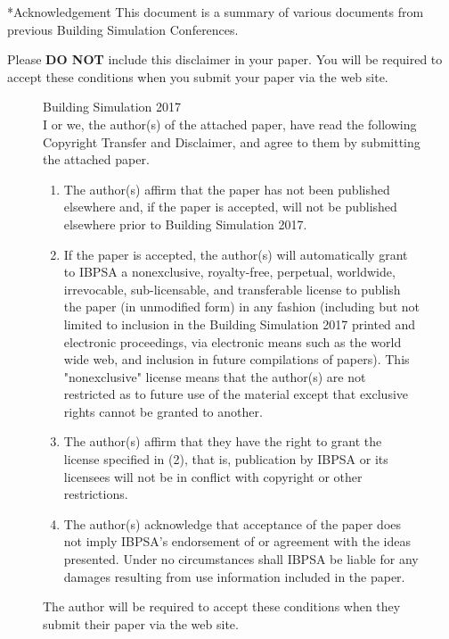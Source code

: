 \documentclass[twocolumn, a4paper,10pt]{article}
\makeatletter
\renewcommand\section{\@startsection{section}{1}{\z@}{0.25cm}{0.1cm}{\normalfont\large\bfseries}}
\makeatother
\begin{document}
\section*{Acknowledgement}
This document is a summary of various documents from previous Building Simulation Conferences.





\newpage
\onecolumn
Please \textbf{DO NOT} include this disclaimer in your paper.  You will be required to accept these conditions when you  submit your paper via the web site.
\begin{figure}
\centering
\begin{boxedminipage}{\textwidth}
Building Simulation 2017\\

I or we, the author(s) of the attached paper, have read the following Copyright Transfer and Disclaimer, and agree to them by submitting the attached paper.
\begin{enumerate}
\item
The author(s) affirm that the paper has not been published elsewhere and, if the paper is accepted, will not be published elsewhere prior to Building Simulation 2017.
\item
If the paper is accepted, the author(s) will automatically grant to IBPSA a nonexclusive, royalty-free, perpetual, worldwide, irrevocable, sub-licensable, and transferable license to publish the paper (in unmodified form) in any fashion (including but not limited to inclusion in the Building Simulation 2017 printed and electronic proceedings, via electronic means such as the world wide web, and inclusion in future compilations of papers).  This "nonexclusive" license means that the author(s) are not restricted as to future use of the material except that exclusive rights cannot be granted to another.
\item
The author(s) affirm that they have the right to grant the license specified in (2), that is, publication by IBPSA or its licensees will not be in conflict with copyright or other restrictions.
\item
The author(s) acknowledge that acceptance of the paper does not imply IBPSA's endorsement of or agreement with the ideas presented.  Under no circumstances shall IBPSA be liable for any damages resulting from use information included in the paper.
\end{enumerate}
\end{boxedminipage}
\caption{The author will be required to accept these conditions when they submit their paper via the web site.}
\label{fig:fig02}
\end{figure}
\end{document}
